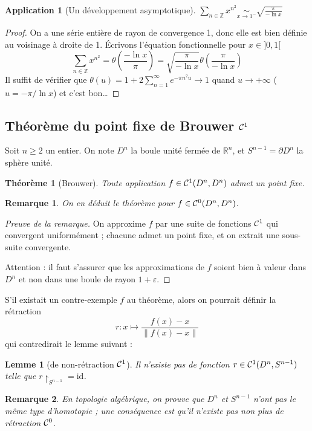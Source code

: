 \documentclass[a4paper, 11pt]{article}
\def\Z{\mathbb{Z}}
\def\R{\mathbb{R}}
\def\Cf{{\cal{C}}}
\newtheorem*{theorem}{Théorème}
\newtheorem*{application}{Application}
\newtheorem*{lemma}{Lemme}
\newtheorem*{remark}{Remarque}
\begin{document}
\begin{application}[Un développement asymptotique]
  $\displaystyle \sum_{n \in \Z} x^{n^2} \underset{x \to 1^-}{\sim}
  \sqrt{\frac{\pi}{- \ln x}}$
\end{application}
\begin{proof}
  On a une série entière de rayon de convergence 1, donc elle est bien définie
  au voisinage à droite de 1. Écrivons l'équation fonctionnelle pour $x \in
  ]0,1[$
  \[ \sum_{n \in \Z} x^{n^2} = \theta\left( \frac{- \ln x}{\pi} \right) =
      \sqrt{\frac{\pi}{- \ln x}} \theta\left( \frac{\pi}{- \ln x} \right)
  \]
  Il suffit de vérifier que $\displaystyle \theta(u) = 1 + 2 \sum_{n=1}^\infty
  e^{-\pi n^2 u}\to 1$ quand $u \to +\infty$ ($u = -\pi/\ln x$) et c'est bon…
\end{proof}

\newpage

\subsection{Théorème du point fixe de Brouwer $\Cf^1$}

Soit $n \geq 2$ un entier. On note $D^n$ la boule unité fermée de $\R^n$, et
$S^{n-1} = \partial D^n$ la sphère unité.

\begin{theorem}[Brouwer]
  Toute application $f \in \Cf^1(D^n, D^n)$ admet un point fixe.
\end{theorem}

\begin{remark}
  On en déduit le théorème pour $f \in \Cf^0(D^n, D^n)$.
\end{remark}
\begin{proof}[Preuve de la remarque]
  On approxime $f$ par une suite de fonctions $\Cf^1$ qui convergent
  uniformément ; chacune admet un point fixe, et on extrait une sous-suite
  convergente.

  Attention : il faut s'assurer que les approximations de $f$ soient bien à
  valeur dans $D^n$ et non dans une boule de rayon $1+\varepsilon$.
\end{proof}

S'il existait un contre-exemple $f$ au théorème, alors on pourrait définir la
rétraction
\[ r : x \mapsto \frac{f(x) - x}{\|f(x) - x\|}\]
qui contredirait le lemme suivant :

\begin{lemma}[de non-rétraction $\Cf^1$]
  Il n'existe pas de fonction $r \in \Cf^1(D^n, S^{n-1})$ telle que
  $r\restriction_{S^{n-1}} = \mathrm{id}$.
\end{lemma}
\begin{remark}
En topologie algébrique, on prouve que $D^n$ et $S^{n-1}$ n'ont pas le même type
d'homotopie ; une conséquence est qu'il n'existe pas non plus de rétraction
$\Cf^0$.
\end{remark}
\end{document}
